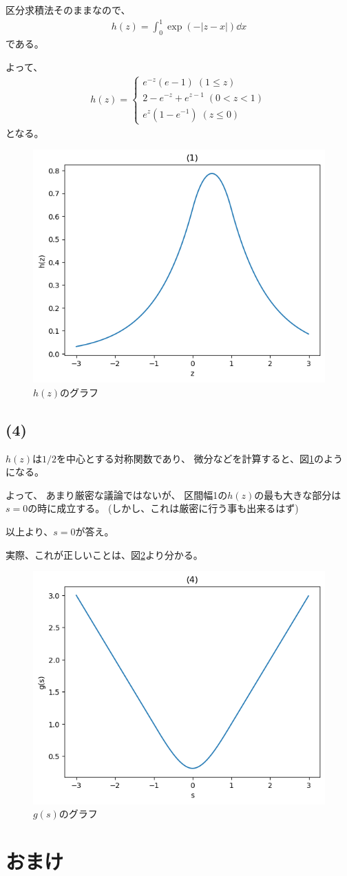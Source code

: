 \documentclass[a4paper, 10pt, dvipdfmx]{jlreq}
\begin{document}
区分求積法そのままなので、
\begin{align*}
  h(z)=\int_0^1{\exp(-|z-x|)}\dd{x}
\end{align*}
である。

よって、
\begin{align*}
  h(z)=
  \begin{cases}
    e^{-z}(e-1) \; (1 \leq z)       \\
    2-e^{-z}+e^{z-1} \; (0 < z < 1) \\
    e^{z}(1-e^{-1}) \; (z \leq 0)
  \end{cases}
\end{align*}
となる。

\begin{figure}[htbp]
  \begin{center}
    \includegraphics[width=0.5\columnwidth]{1.png}
    \caption{$h(z)$のグラフ}
    \label{fig:1}
  \end{center}
\end{figure}

\subsection*{(4)}

$h(z)$は$1/2$を中心とする対称関数であり、
微分などを計算すると、図\ref{fig:1}のようになる。

よって、
あまり厳密な議論ではないが、
区間幅1の$h(z)$の最も大きな部分は$s=0$の時に成立する。
(しかし、これは厳密に行う事も出来るはず)

以上より、$s=0$が答え。

実際、これが正しいことは、図\ref{fig:4}より分かる。

\begin{figure}[htbp]
  \begin{center}
    \includegraphics[width=0.5\columnwidth]{4.png}
    \caption{$g(s)$のグラフ}
    \label{fig:4}
  \end{center}
\end{figure}

\newpage

\section*{おまけ}


\end{document}
